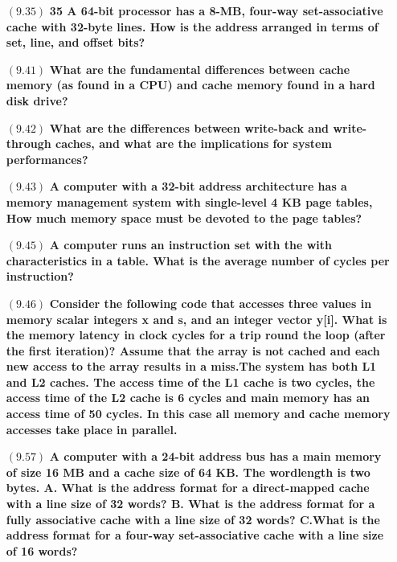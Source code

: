 \documentclass[letterpaper,10pt,titlepage]{article}
\begin{document}
\begin{enumerate}
\item[$(9.35)$] \textbf{35 A 64-bit processor has a 8-MB, four-way set-associative cache with 32-byte lines. How is the address arranged in terms of set, line, and offset bits?}

\item[$(9.41)$] \textbf{What are the fundamental differences between cache memory (as found in a CPU) and cache memory found in a hard disk drive?}

\item[$(9.42)$] \textbf{What are the differences between write-back and write-through caches, and what are the implications for system performances?}

\item[$(9.43)$] \textbf{A computer with a 32-bit address architecture has a memory management system with single-level 4 KB page tables, How much memory space must be devoted to the page tables?}

\item[$(9.45)$] \textbf{A computer runs an instruction set with the with characteristics in a table. What is the average number of cycles per instruction?}

\item[$(9.46)$] \textbf{Consider the following code that accesses three values in memory scalar integers x and s, and an integer vector y[i]. What is the memory latency in clock cycles for a trip round the loop (after the first iteration)? Assume that the array is not cached and each new access to the array results in a miss.The system has both L1 and L2 caches. The access time of the L1 cache is two cycles, the access time of the L2 cache is 6 cycles and main memory has an access time of 50 cycles. In this case all memory and cache memory accesses take place in parallel.}

\item[$(9.57)$] \textbf{A computer with a 24-bit address bus has a main memory of size 16 MB and a cache size of 64 KB. The wordlength is two bytes. A. What is the address format for a direct-mapped cache with a line size of 32 words? B. What is the address format for a fully associative cache with a line size of 32 words? C.What is the address format for a four-way set-associative cache with a line size of 16 words?}

\end{enumerate}
\end{document}
